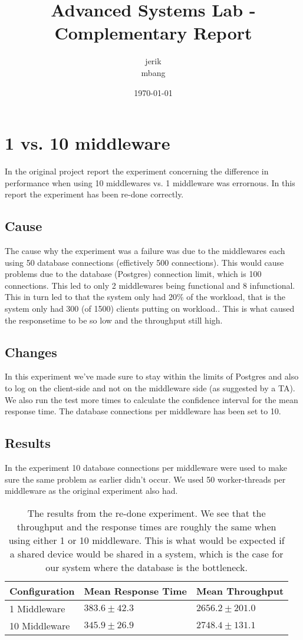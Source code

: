 \documentclass[a4paper, 11pt]{article}
\title{Advanced Systems Lab - Complementary Report}
\author{jerik\\mbang\\}
\date{\today}
\begin{document}
\maketitle

\section{1 vs. 10 middleware}
In the original project report the experiment concerning the difference in performance when using 10 middlewares vs. 1 middleware was errornous. In this report the experiment has been re-done correctly.

\subsection{Cause}
The cause why the experiment was a failure was due to the middlewares each using 50 database connections (effictively 500 connections). 
This would cause problems due to the database (Postgres) connection limit, which is 100 connections. 
This led to only 2 middlewares being functional and 8 infunctional. This in turn led to that the system only had 20\% of the workload, that is the system only had 300 (of 1500) clients putting on workload.. This is what caused the responsetime to be so low and the throughput still high.\\

\subsection{Changes}
In this experiment we've made sure to stay within the limits of Postgres and also to log on the client-side and not on the middleware side (as suggested by a TA). We also run the test more times to calculate the confidence interval for the mean response time. The database connections per middleware has been set to 10.

\subsection{Results}
In the experiment 10 database connections per middleware were used to make sure the same problem as earlier didn't occur. We used 50 worker-threads per middleware as the original experiment also had.
\begin{table}[!htbp]
    \begin{tabular}{|l|l|l|}
    \hline
    Configuration & Mean Response Time & Mean Throughput \\ \hline
    1 Middleware  & $383.6 \pm 42.3$       	&   $2656.2 \pm 201.0 $  \\ \hline
    10 Middleware & $345.9 \pm 26.9$       	&   $2748.4 \pm 131.1 $  \\ \hline
    \end{tabular}
    \label{table}
    \caption{The results from the re-done experiment. We see that the throughput and the response times are roughly the same when using either 1 or 10 middleware. This is what would be expected if a shared device would be shared in a system, which is the case for our system where the database is the bottleneck.}
\end{table}
\FloatBarrier %
\end{document}
